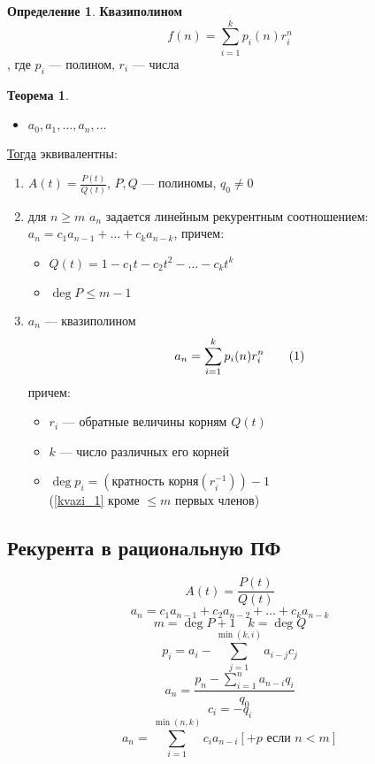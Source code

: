 \documentclass[english]{article}
\newcommand\addtag{\refstepcounter{equation}\tag{\theequation}}
\theoremstyle{plain}
\theoremstyle{remark}
\theoremstyle{definition}
\newtheorem{theorem}{Теорема}[section]
\newtheorem*{definition}{Определение}
\begin{document}
\begin{definition}
\textbf{Квазиполином}
\[ f(n) = \sum_{i = 1}^k p_i(n)r_i^n \], где \(p_i\) --- полином, \(r_i\) --- числа
\end{definition}
\begin{theorem}
\begin{itemize}
\item \(a_0, a_1, \dots, a_n, \dots\)
\end{itemize}
\uline{Тогда} эквивалентны:
\begin{enumerate}
\item \(A(t) = \frac{P(t)}{Q(t)}\), \(P, Q\) --- полиномы, \(q_0 \neq 0\)
\item для \(n \ge m\) \(a_n\) задается линейным рекурентным соотношением: \(a_n = c_1a_{n - 1} + \dots + c_ka_{n - k}\), причем:
\begin{itemize}
\item \(Q(t) = 1 - c_1t - c_2t^2 - \dots - c_kt^k\)
\item \(\deg P \le m - 1\)
\end{itemize}
\item \(a_n\) --- квазиполином \[ a_n = \sum_{i = 1}^k p_i(n)r_i^n \label{kvazi_1}\addtag \]
причем:
\begin{itemize}
\item \(r_i\) --- обратные величины корням \(Q(t)\)
\item \(k\) --- число различных его корней
\item \(\deg p_i = (\text{кратность корня}(r_i^{-1})) - 1\) \\
(\ref{kvazi_1} кроме \(\le m\) первых членов)
\end{itemize}
\end{enumerate}
\end{theorem}

\subsection{Рекурента в рациональную ПФ}
\label{sec:org720ac5a}
\[ A(t) = \frac{P(t)}{Q(t)} \]
\[ a_n = c_1 a_{n - 1} + c_2 a_{n - 2} + \dots + c_ka_{n - k} \]
\[ m = \deg P + 1\quad k = \deg Q \]
\[ p_i = a_i - \sum_{j = 1}^{\min(k, i)} a_{i - j} c_j \]
\[ a_n = \frac{p_n - \sum_{i = 1}^n a_{n - i}q_i}{q_0} \]
\[ c_i = -q_i \]
\[ a_n = \sum_{i = 1}^{\min(n, k)} c_i a_{n - i} [+ p\text{ если } n < m] \]
\end{document}
